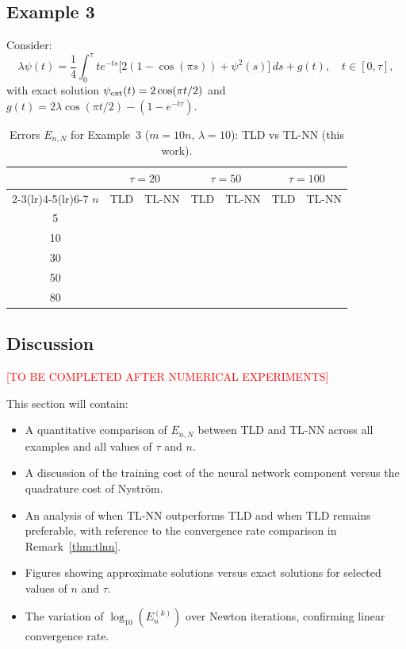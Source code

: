 \documentclass[12pt, a4paper]{article}
\begin{document}
\subsection{Example 3}

Consider:
\begin{equation}
  \lambda\psi(t) = \frac{1}{4}\int_0^\tau
  t e^{-ts}\bigl[2(1-\cos(\pi s)) + \psi^2(s)\bigr]
  \, ds + g(t),
  \quad t \in [0, \tau],
  \label{eq:ex3}
\end{equation}
with exact solution $\psi_{\rm ext}(t) = 2\cos(\pi t/2)$
and $g(t) = 2\lambda\cos(\pi t/2) - (1 - e^{-t\tau})$.

\begin{table}[H]
\centering
\caption{Errors $E_{n,N}$ for Example~3 ($m = 10n$,
$\lambda = 10$): TLD \cite{sedka2025} vs TL-NN (this work).}
\label{tab:ex3}
\begin{tabular}{c cc cc cc}
\toprule
& \multicolumn{2}{c}{$\tau = 20$}
& \multicolumn{2}{c}{$\tau = 50$}
& \multicolumn{2}{c}{$\tau = 100$} \\
\cmidrule(lr){2-3}\cmidrule(lr){4-5}\cmidrule(lr){6-7}
$n$ & TLD & TL-NN & TLD & TL-NN & TLD & TL-NN \\
\midrule
5   & & & & & & \\
10  & & & & & & \\
30  & & & & & & \\
50  & & & & & & \\
80  & & & & & & \\
\bottomrule
\end{tabular}
\end{table}

\subsection{Discussion}

\textcolor{red}{[TO BE COMPLETED AFTER NUMERICAL EXPERIMENTS]}

This section will contain:
\begin{itemize}
  \item A quantitative comparison of $E_{n,N}$ between
    TLD and TL-NN across all examples and all values of
    $\tau$ and $n$.
  \item A discussion of the training cost of the neural
    network component versus the quadrature cost of Nystr\"{o}m.
  \item An analysis of when TL-NN outperforms TLD and when
    TLD remains preferable, with reference to the convergence
    rate comparison in Remark~\ref{thm:tlnn}.
  \item Figures showing approximate solutions versus exact
    solutions for selected values of $n$ and $\tau$.
  \item The variation of $\log_{10}(E_n^{(k)})$ over
    Newton iterations, confirming linear convergence rate.
\end{itemize}
\end{document}
